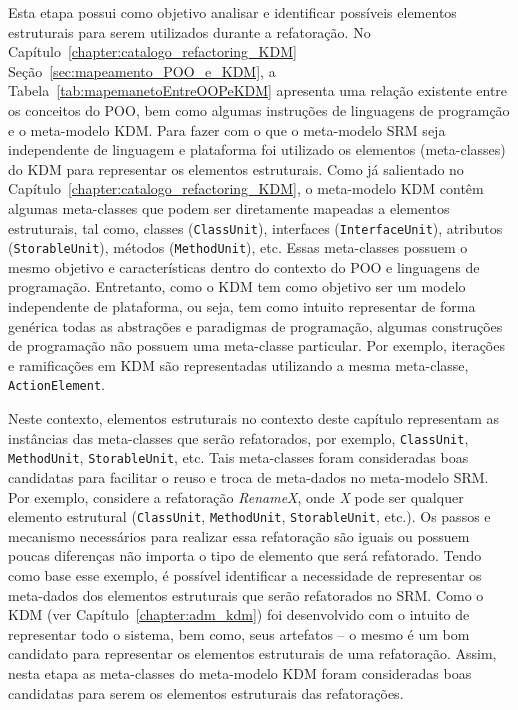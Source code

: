 Esta etapa possui como objetivo analisar e identificar possíveis elementos estruturais para serem utilizados durante a refatoração. No Capítulo~\ref{chapter:catalogo_refactoring_KDM} Seção~\ref{sec:mapeamento_POO_e_KDM}, a Tabela~\ref{tab:mapemanetoEntreOOPeKDM} apresenta uma relação existente entre os conceitos do POO, bem como algumas instruções de linguagens de programção e o meta-modelo KDM. Para fazer com o que o meta-modelo SRM seja independente de linguagem e plataforma foi utilizado os elementos (meta-classes) do KDM para representar os elementos estruturais. Como já salientado no Capítulo~\ref{chapter:catalogo_refactoring_KDM}, o meta-modelo KDM contêm algumas meta-classes que podem ser diretamente mapeadas a elementos estruturais, tal como, classes (\texttt{ClassUnit}), interfaces (\texttt{InterfaceUnit}), atributos (\texttt{StorableUnit}), métodos (\texttt{MethodUnit}), etc. Essas meta-classes possuem o mesmo objetivo e características dentro do contexto do POO e linguagens de programação. Entretanto, como o KDM tem como objetivo ser um modelo independente de plataforma, ou seja, tem como intuito representar de forma genérica todas as abstrações e paradigmas de programação, algumas construções de programação não possuem uma meta-classe particular. Por exemplo, iterações e ramificações em KDM são representadas utilizando a mesma meta-classe, \texttt{ActionElement}.

Neste contexto, elementos estruturais no contexto deste capítulo representam as instâncias das meta-classes que serão refatorados, por exemplo, \texttt{ClassUnit}, \texttt{MethodUnit}, \texttt{StorableUnit}, etc. Tais meta-classes foram consideradas boas candidatas para facilitar o reuso e troca de meta-dados no meta-modelo SRM. Por exemplo, considere a refatoração \textit{RenameX}, onde \textit{X} pode ser qualquer elemento estrutural (\texttt{ClassUnit}, \texttt{MethodUnit}, \texttt{StorableUnit}, etc.). Os passos e mecanismo necessários para realizar essa refatoração são iguais ou possuem poucas diferenças não importa o tipo de elemento que será refatorado. Tendo como base esse exemplo, é possível identificar a necessidade de representar os meta-dados dos elementos estruturais que serão refatorados no SRM. Como o KDM (ver Capítulo~\ref{chapter:adm_kdm}) foi desenvolvido com o intuito de representar todo o sistema, bem como, seus artefatos – o mesmo é um bom candidato para representar os elementos estruturais de uma refatoração. Assim, nesta etapa as meta-classes do meta-modelo KDM foram consideradas boas candidatas para serem os elementos estruturais das refatorações.

